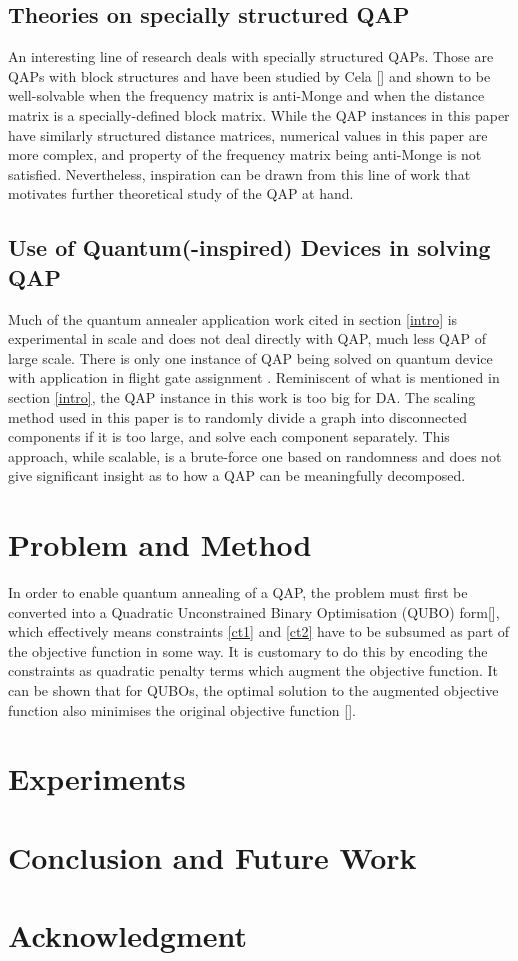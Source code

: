 \documentclass[conference]{IEEEtran}
\begin{document}
\subsection{Theories on specially structured QAP}
An interesting line of research deals with specially structured QAPs. Those are QAPs with block structures and have been studied by Cela [] and shown to be well-solvable when the frequency matrix is anti-Monge and when the distance matrix is a specially-defined block matrix. While the QAP instances in this paper have similarly structured distance matrices, numerical values in this paper are more complex, and property of the frequency matrix being anti-Monge is not satisfied. Nevertheless, inspiration can be drawn from this line of work that motivates further theoretical study of the QAP at hand.

\subsection{Use of Quantum(-inspired) Devices in solving QAP}
Much of the quantum annealer application work cited in section \ref{intro} is experimental in scale and does not deal directly with QAP, much less QAP of large scale. There is only one instance of QAP being solved on quantum device with application in flight gate assignment \cite{Stollenwerk:2019}. Reminiscent of what is mentioned in section \ref{intro}, the QAP instance in this work is too big for DA. The scaling method used in this paper is to randomly divide a graph into disconnected components if it is too large, and solve each component separately. This approach, while scalable, is a brute-force one based on randomness and does not give significant insight as to how a QAP can be meaningfully decomposed.

\section{Problem and Method}
In order to enable quantum annealing of a QAP, the problem must first be converted into a Quadratic Unconstrained Binary Optimisation (QUBO) form[], which effectively means constraints \eqref{ct1} and \eqref{ct2} have to be subsumed as part of the objective function in some way. It is customary to do this by encoding the constraints as quadratic penalty terms which augment the objective function. It can be shown that for QUBOs, the optimal solution to the augmented objective function also minimises the original objective function [].

\section{Experiments}

\section{Conclusion and Future Work}

\section*{Acknowledgment}




\end{document}
